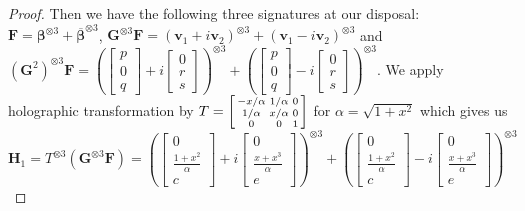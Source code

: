 \documentclass[11pt]{article}
\newcommand{\teh}{^{\otimes 3}}
\begin{document}
\begin{proof}
  Then we have the following three signatures at our disposal:
  $\mathbf{F} = \boldsymbol{\beta}\teh + \overline{\boldsymbol{\beta}}\teh$, $\mathbf{G}\teh \mathbf{F} = (\mathbf{v}_1 + i \mathbf{v}_2)\teh + (\mathbf{v}_1 - i \mathbf{v}_2)\teh$ and $(\mathbf{G}^2)\teh \mathbf{F} = \left(\begin{bmatrix}
    p \\ 0 \\ q
    \end{bmatrix} + i \begin{bmatrix}
    0 \\ r \\ s
    \end{bmatrix}\right) \teh + \left(\begin{bmatrix}
    p \\ 0 \\ q
    \end{bmatrix} - i \begin{bmatrix}
    0 \\ r \\ s
  \end{bmatrix} \right)\teh$.
  We apply holographic transformation by $T =
  \begin{bsmallmatrix}
    -x/\alpha & 1/\alpha & 0 \\
    1/\alpha & x/\alpha & 0 \\
    0 & 0 & 1
  \end{bsmallmatrix}$ for $\alpha = \sqrt{1 + x^2}$ which gives us 
  \[
    \mathbf{H}_1 = 
    T \teh (\mathbf{G} \teh \mathbf{F}) = \left(\begin{bmatrix}
        0 \\ \frac{1 + x^2}{\alpha} \\ c
        \end{bmatrix} + i \begin{bmatrix}
        0 \\ \frac{x + x^3}{\alpha} \\ e
    \end{bmatrix}\right)\teh + \left(
    \begin{bmatrix}
      0 \\ \frac{1 + x^2}{\alpha} \\ c
    \end{bmatrix}
    -i  \begin{bmatrix}
      0 \\ \frac{x + x^3}{\alpha} \\ e
    \end{bmatrix}
  \right)\teh
\]
\end{proof}
\end{document}
